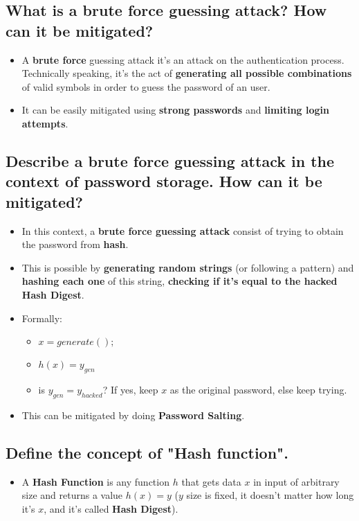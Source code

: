 \documentclass[9pt, letterpaper]{article}
\begin{document}
\subsection{What is a brute force guessing attack? How can it be mitigated?}
\begin{itemize}
	\item A \textbf{brute force} guessing attack it's an attack on the authentication process. Technically speaking, it's the act of \textbf{generating all possible combinations} of valid symbols in order to guess the password of an user.
	\item It can be easily mitigated using \textbf{strong passwords} and \textbf{limiting login attempts}.
\end{itemize}

\subsection{Describe a brute force guessing attack in the context of password storage. How can it be mitigated?}
\begin{itemize}
	\item In this context, a \textbf{brute force guessing attack} consist of trying to obtain the password from \textbf{hash}.
	\item This is possible by \textbf{generating random strings} (or following a pattern) and \textbf{hashing each one} of this string, \textbf{checking if it's equal to the hacked Hash Digest}.
	\item Formally:
	      \begin{itemize}
		      \item $x= generate(); $
		      \item $h(x)=y_{gen}$
		      \item is $y_{gen}= y_{hacked}$? If yes, keep $x$ as the original password, else keep trying.
	      \end{itemize}
	\item This can be mitigated by doing \textbf{Password Salting}.
\end{itemize}

\subsection{Define the concept of "Hash function".}
\begin{itemize}
	\item A \textbf{Hash Function} is any function $h$ that gets data $x$ in input of arbitrary size and returns a value $h(x)=y$ ($y$ size is fixed, it doesn't matter how long it's $x$, and it's called \textbf{Hash Digest}).
\end{itemize}
\end{document}

